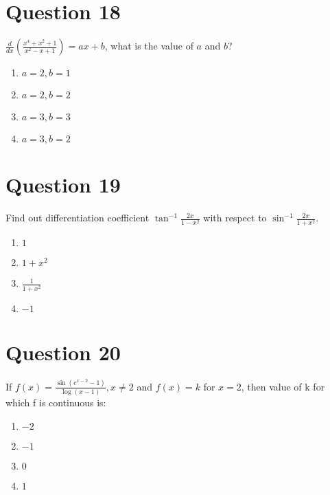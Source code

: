 \documentclass{article}
\begin{document}
\section*{Question 18}
\(\frac{{d}}{{dx}}\left(\frac{{x}^{4}+{x}^{2}+1}{{x}^{2}-{x}+1}\right)={ax}+{b}\), what is the value of \(a\) and \(b ?\)
\begin{enumerate}[label=(\alph*)]
\item \(a=2, b=1\)
\item \(a=2, b=2\)
\item \(a=3, b=3\)
\item \(a=3, b=2\)
\end{enumerate}
\newpage
\section*{Question 19}
Find out differentiation coefficient \(\tan ^{-1} \frac{2 x}{1-x^{2}}\) with respect to \(\sin ^{-1} \frac{2 x}{1+x^{2}}\).
\begin{enumerate}[label=(\alph*)]
\item \(1\)
\item \(1+x^{2}\)
\item \(\frac{1}{1+x^{2}}\)
\item \(-1\)
\end{enumerate}
\newpage
\section*{Question 20}
If \(f(x)=\frac{\sin \left(e^{x-2}-1\right)}{\log (x-1)}, x \neq 2\) and \(f(x)=k\) for \(x = 2\), then value of k for which f is continuous is:
\begin{enumerate}[label=(\alph*)]
\item \(-2\)
\item \(-1\)\newline
\item \(0\)\newline
\item \(1\)
\end{enumerate}
\newpage
\end{document}
